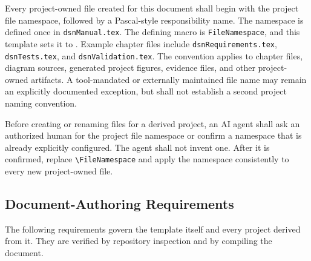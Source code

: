 Every project-owned file created for this document shall begin with the project
file namespace, followed by a Pascal-style responsibility name. The namespace
is defined once in \texttt{dsnManual.tex}. The defining macro is
\texttt{FileNamespace}, and this template sets it to
\texttt{\FileNamespace}. Example chapter files include
\texttt{dsnRequirements.tex}, \texttt{dsnTests.tex}, and
\texttt{dsnValidation.tex}. The convention applies to chapter files, diagram
sources, generated project figures, evidence files, and other project-owned
artifacts. A tool-mandated or externally maintained file name may remain an
explicitly documented exception, but shall not establish a second project
naming convention.

Before creating or renaming files for a derived project, an AI agent shall ask
an authorized human for the project file namespace or confirm a namespace that
is already explicitly configured. The agent shall not invent one. After it is
confirmed, replace \verb|\FileNamespace| and apply the namespace consistently
to every new project-owned file.

\subsection{Document-Authoring Requirements}
The following requirements govern the template itself and every project derived
from it. They are verified by repository inspection and by compiling the
document.

